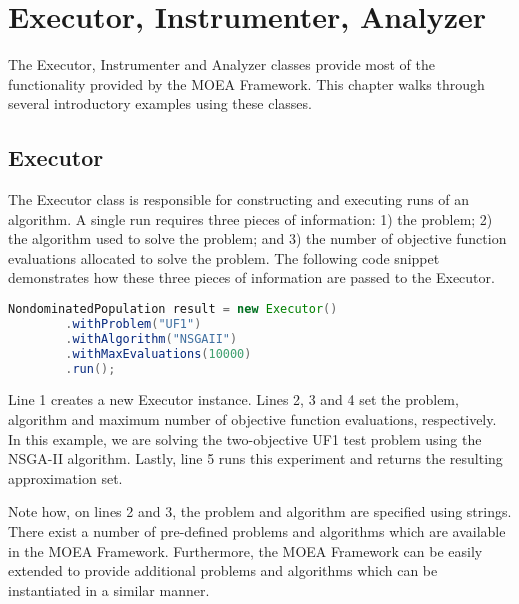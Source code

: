 %
%

\chapter{Executor, Instrumenter, Analyzer}

The Executor, Instrumenter and Analyzer classes provide most of the functionality provided by the MOEA Framework.  This chapter walks through several introductory examples using these classes.

\section{Executor}
The Executor class is responsible for constructing and executing runs of an algorithm.  A single run requires three pieces of information: 1) the problem; 2) the algorithm used to solve the problem; and 3) the number of objective function evaluations allocated to solve the problem.  The following code snippet demonstrates how these three pieces of information are passed to the Executor.

\begin{lstlisting}[language=Java]
NondominatedPopulation result = new Executor()
		.withProblem("UF1")
		.withAlgorithm("NSGAII")
		.withMaxEvaluations(10000)
		.run();
\end{lstlisting}

Line 1 creates a new Executor instance.  Lines 2, 3 and 4 set the problem, algorithm and maximum number of objective function evaluations, respectively.  In this example, we are solving the two-objective UF1 test problem using the NSGA-II algorithm.  Lastly, line 5 runs this experiment and returns the resulting approximation set.

Note how, on lines 2 and 3, the problem and algorithm are specified using strings.  There exist a number of pre-defined problems and algorithms which are available in the MOEA Framework.  Furthermore, the MOEA Framework can be easily extended to provide additional problems and algorithms which can be instantiated in a similar manner.

